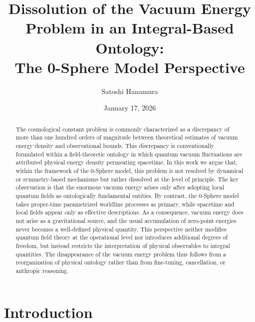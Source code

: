 \documentclass[%
 reprint,
 amsmath,amssymb,
 aps,
 prb,
]{revtex4-2}
\numberwithin{equation}{section}
\begin{document}
\title{Dissolution of the Vacuum Energy Problem in an Integral-Based Ontology:\\ The 0-Sphere Model Perspective}

\author{Satoshi Hanamura}
\date{January 17, 2026}


\begin{abstract}
The cosmological constant problem is commonly characterized as a discrepancy of more than one hundred orders of magnitude between theoretical estimates of vacuum energy density and observational bounds. This discrepancy is conventionally formulated within a field-theoretic ontology in which quantum vacuum fluctuations are attributed physical energy density permeating spacetime. In this work we argue that, within the framework of the 0-Sphere model, this problem is not resolved by dynamical or symmetry-based mechanisms but rather dissolved at the level of principle. The key observation is that the enormous vacuum energy arises only after adopting local quantum fields as ontologically fundamental entities. By contrast, the 0-Sphere model takes proper-time parametrized worldline processes as primary, while spacetime and local fields appear only as effective descriptions. As a consequence, vacuum energy does not arise as a gravitational source, and the usual accumulation of zero-point energies never becomes a well-defined physical quantity. This perspective neither modifies quantum field theory at the operational level nor introduces additional degrees of freedom, but instead restricts the interpretation of physical observables to integral quantities. The disappearance of the vacuum energy problem thus follows from a reorganization of physical ontology rather than from fine-tuning, cancellation, or anthropic reasoning.
\end{abstract}

\maketitle

\section{Introduction}
\label{sec:introduction}
\end{document}
